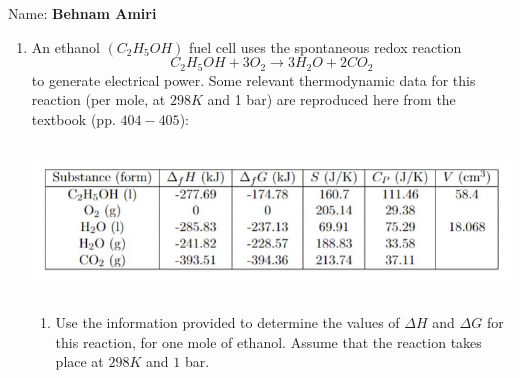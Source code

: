 \documentclass[fleqn]{article}
\begin{document}
  Name: \textbf{Behnam Amiri}

  \vspace{1cm}



  \begin{enumerate}
    \item An ethanol $(C_2 H_5 OH)$ fuel cell uses the spontaneous redox reaction
    $$
      C_2 H_5 OH+3O_2 \longrightarrow 3 H_2O+2CO_2
    $$
    to generate electrical power. Some relevant thermodynamic data for this reaction (per mole,
    at $298 K$ and 1 bar) are reproduced here from the textbook (pp. $404-405$):
    \begin{center}
      \includegraphics[height=4cm, width=14cm]{1.JPG}
    \end{center}
    \begin{enumerate}
      \item Use the information provided to determine the values of $\Delta H$ and $\Delta G$ for this reaction, for
      one mole of ethanol. Assume that the reaction takes place at $298 K$ and $1$ bar.


\end{enumerate}
\end{enumerate}
\end{document}
